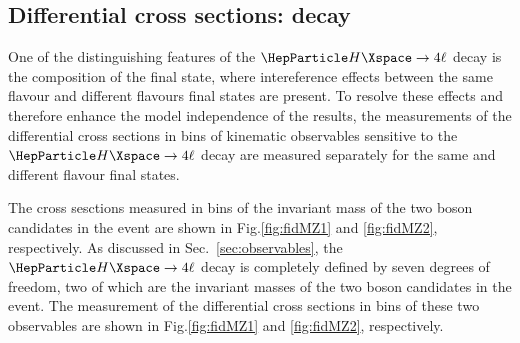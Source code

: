 

\subsection{Differential cross sections: decay}
One of the distinguishing features of the $\Hllll$ decay is the composition of the final state, where intereference effects between the same flavour and different flavours final states are present.
To resolve these effects and therefore enhance the model independence of the results, the measurements of the differential cross sections in bins of kinematic observables sensitive to the $\Hllll$ decay are measured separately for the same and different flavour final states.

The cross sesctions measured in bins of the invariant mass of the two \PZ boson candidates in the event are shown in Fig.\ref{fig:fidMZ1} and \ref{fig:fidMZ2}, respectively.
As discussed in Sec.~\ref{sec:observables}, the $\Hllll$ decay is completely defined by seven degrees of freedom, two of which are the invariant masses of the two \PZ boson candidates in the event. The measurement of the differential cross sections in bins of these two observables are shown in Fig.\ref{fig:fidMZ1} and \ref{fig:fidMZ2}, respectively.

